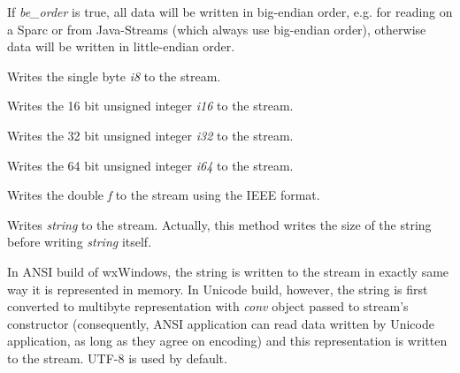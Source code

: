 
If {\it be\_order} is true, all data will be written in big-endian
order, e.g. for reading on a Sparc or from Java-Streams (which
always use big-endian order), otherwise data will be written in
little-endian order.
 


Writes the single byte {\it i8} to the stream.



Writes the 16 bit unsigned integer {\it i16} to the stream.



Writes the 32 bit unsigned integer {\it i32} to the stream.



Writes the 64 bit unsigned integer {\it i64} to the stream.



Writes the double {\it f} to the stream using the IEEE format.

\label{wxdataoutputstreamwritestring}


Writes {\it string} to the stream. Actually, this method writes the size of
the string before writing {\it string} itself.

In ANSI build of wxWindows, the string is written to the stream in exactly
same way it is represented in memory. In Unicode build, however, the string
is first converted to multibyte representation with {\it conv} object passed
to stream's constructor (consequently, ANSI application can read data 
written by Unicode application, as long as they agree on encoding) and this
representation is written to the stream. UTF-8 is used by default.

